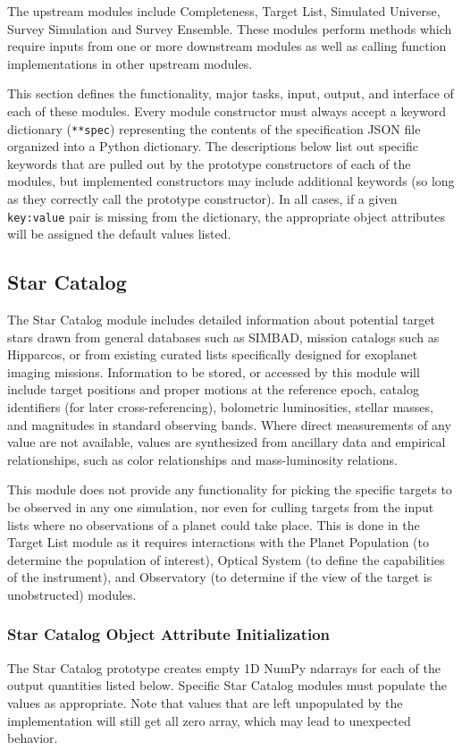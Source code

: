 \documentclass[cleanfoot]{asme2ej}
\begin{document}
The upstream modules include Completeness, Target List, Simulated Universe, Survey Simulation and Survey Ensemble. These modules perform methods which require inputs from one or more downstream modules as well as calling function implementations in other upstream modules. 

This section defines the functionality, major tasks, input, output, and interface of each of these modules. Every module constructor must always accept a keyword dictionary (\verb+**spec+) representing the contents of the specification JSON file organized into a Python dictionary. The descriptions below list out specific keywords that are pulled out by the prototype constructors of each of the modules, but implemented constructors may include additional keywords (so long as they correctly call the prototype constructor).  In all cases, if a given \verb+key:value+ pair is missing from the dictionary, the appropriate object attributes will be assigned the default values listed.



\subsection{Star Catalog} \label{sec:starcatalog}
The Star Catalog module includes detailed information about potential target stars drawn from general databases such as SIMBAD, mission catalogs such as Hipparcos, or from existing curated lists specifically designed for exoplanet imaging missions.  Information to be stored, or accessed by this module will include target positions and proper motions at the reference epoch, catalog identifiers (for later cross-referencing), bolometric luminosities, stellar masses, and magnitudes in standard observing bands.  Where direct measurements of any value are not available, values are synthesized from ancillary data and empirical relationships, such as color relationships and mass-luminosity relations.

This module does not provide any functionality for picking the specific targets to be observed in any one simulation, nor even for culling targets from the input lists where no observations of a planet could take place.  This is done in the Target List module as it requires interactions with the Planet Population (to determine the population of interest), Optical System (to define the capabilities of the instrument), and Observatory (to determine if the view of the target is unobstructed) modules.

\subsubsection{Star Catalog Object Attribute Initialization} 
The Star Catalog prototype creates empty 1D NumPy ndarrays for each of the output quantities listed below.  Specific Star Catalog modules must populate the values as appropriate.  Note that values that are left unpopulated by the implementation will still get all zero array, which may lead to unexpected behavior.
\end{document}
